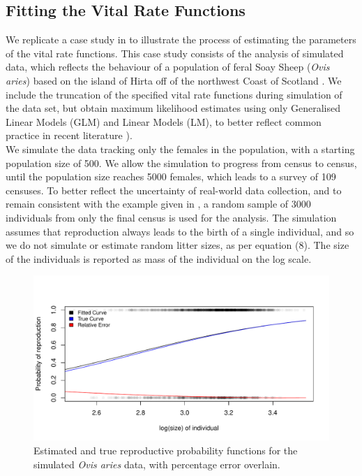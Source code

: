 \documentclass[a4paper,12pt]{article}
\begin{document}
\subsection{Fitting the Vital Rate Functions}

We replicate a case study in \citet{Ellner} to illustrate the process of estimating the parameters of the vital rate functions. This case study consists of the analysis of simulated data, which reflects the behaviour of a population of feral Soay Sheep (\textit{Ovis  aries}) based on the island of Hirta off of the northwest Coast of Scotland \citep{Ellner}. We include the truncation of the specified vital rate functions during simulation of the data set, but obtain maximum likelihood estimates using only Generalised Linear Models (GLM) and Linear Models (LM), to better reflect common practice in recent literature \citep{Snakes, ThreatenedHerb, Struck, NichePlants, Quintana}).\\


We simulate the data tracking only the females in the population, with a starting population size of 500. We allow the simulation to progress from census to census, until the population size reaches 5000 females, which leads to a survey of 109 censuses. To better reflect the uncertainty of real-world data collection, and to remain consistent with the example given in \citet{Ellner}, a random sample of 3000 individuals from only the final census is used for the analysis. The simulation assumes that reproduction always leads to the birth of a single individual, and so we do not simulate or estimate random litter sizes, as per equation (8). The size of the individuals is reported as mass of the individual on the log scale. \\

\begin{figure}[H]
\begin{center}
\includegraphics[scale=0.85]{UngulateReprIPM.pdf}
\caption{\label{ungRepIPM}Estimated and true reproductive probability functions for the simulated \textit{Ovis aries} data, with percentage error overlain.}
\end{center}
\end{figure}
\end{document}
